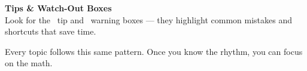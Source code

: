 {\begin{center}
\begin{minipage}{0.88\textwidth}
\begin{tcolorbox}[enhanced, colback=funPurple!4, colframe=funPurple!20, arc=5pt,
    boxrule=0.6pt, left=12mm, right=6mm, top=4mm, bottom=4mm,
    overlay={\node[circle, fill=funPurple, inner sep=0pt, minimum size=22pt,
        text=white, font=\bfseries\small] at ([xshift=6mm]frame.west) {6};}]
    {\large\bfseries\color{funPurpleDark}Tips \& Watch-Out Boxes}\\[2pt]
    {\color{black!55}Look for the \textcolor{funPurple}{\faLightbulb}~tip
    and \textcolor{funRed}{\faExclamationTriangle}~warning boxes ---
    they highlight common mistakes and shortcuts that save time.}
\end{tcolorbox}

\end{minipage}
\end{center}

\vspace{6mm}

\begin{center}
    \color{funGray}\normalsize
    \faInfoCircle\hspace{2mm}Every topic follows this same pattern.
    Once you know the rhythm, you can focus on the math.
\end{center}

}

\clearpage
